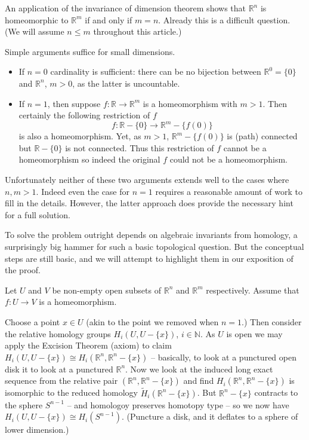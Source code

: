 \documentclass[12pt]{article}
\begin{document}
An application of the invariance of dimension theorem shows that $\mathbb{R}^n$ is homeomorphic to $\mathbb{R}^m$ if and only if $m=n$.  Already this is a difficult question.  (We will assume $n\leq m$ throughout this article.)

Simple arguments suffice for small dimensions.
\begin{itemize}
\item If $n=0$ cardinality is sufficient: there can be no bijection between $\mathbb{R}^0=\{0\}$ and $\mathbb{R}^n$, $m>0$, as the latter is uncountable.
\item
If $n=1$, then suppose $f:\mathbb{R}\rightarrow\mathbb{R}^m$ is a homeomorphism with $m>1$.  Then certainly the following restriction of $f$
\[f:\mathbb{R}-\{0\}\rightarrow \mathbb{R}^m-\{f(0)\}\]
is also a homeomorphism.  Yet, as $m>1$, $\mathbb{R}^m-\{f(0)\}$ is (path) connected but $\mathbb{R}-\{0\}$ is not connected.  Thus this restriction of
$f$ cannot be a homeomorphism so indeed the original $f$ could not be a homeomorphism.
\end{itemize}
Unfortunately neither of these two arguments extends well to the cases where $n,m>1$.  Indeed even the case for $n=1$ requires a reasonable amount of work to fill in the details.  However, the latter approach does provide the necessary hint for a full solution.

To solve the problem outright depends on algebraic invariants from homology, a
surprisingly big hammer for such a basic topological question.  But the conceptual steps are still basic, and we will attempt to highlight them in our exposition of the proof.

Let $U$ and $V$ be non-empty open subsets of $\mathbb{R}^n$ and $\mathbb{R}^m$ respectively.  Assume that $f:U\rightarrow V$ is a homeomorphism.  

Choose a point $x\in U$ (akin to the point we removed when $n=1$.)  Then consider the relative homology groups $H_i(U,U-\{x\})$, $i\in \mathbb{N}$.  As $U$ is open we may apply the Excision Theorem (axiom) to claim $H_i(U,U-\{x\})\cong H_i(\mathbb{R}^n,\mathbb{R}^n-\{x\})$ -- basically, to look at a punctured open disk it to look at a punctured $\mathbb{R}^n$.  Now we look at the induced long exact sequence from the relative pair $(\mathbb{R}^n,\mathbb{R}^n-\{x\})$ and find $H_i(\mathbb{R}^n,\mathbb{R}^n-\{x\})$ is isomorphic to the reduced homology $\tilde{H}_i(\mathbb{R}^n-\{x\})$.  But $\mathbb{R}^n-\{x\}$ contracts to the sphere $S^{n-1}$ -- and homologoy preserves homotopy type -- so we now have $H_i(U,U-\{x\})\cong H_i(S^{n-1})$.  (Puncture a disk, and it deflates to a sphere of lower dimension.)  
\end{document}
